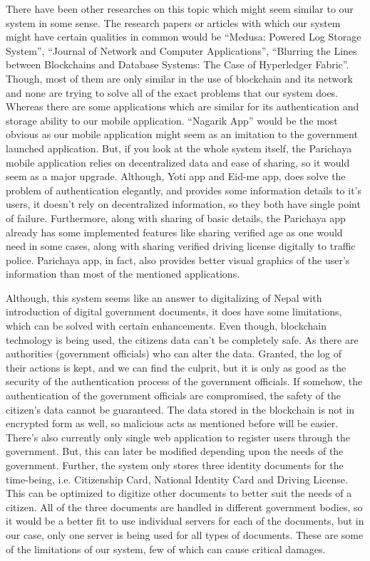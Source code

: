 There have been other researches on this topic which might seem similar to our system in some sense. The research papers or articles with which our system might have certain qualities in common would be “Medusa: Powered Log Storage System”,  “Journal of Network and Computer Applications”, “Blurring the Lines between Blockchains and Database Systems: The Case of Hyperledger Fabric”. Though, most of them are only similar in the use of blockchain and its network and none are trying to solve all of the exact problems that our system does. Whereas there are some applications which are similar for its authentication and storage ability to our mobile application. “Nagarik App” would be the most obvious as our mobile application might seem as an imitation to the government launched application. But, if you look at the whole system itself, the Parichaya mobile application relies on decentralized data and ease of sharing, so it would seem as a major upgrade. Although, Yoti app and Eid-me app, does solve the problem of authentication elegantly, and provides some information details to it’s users, it doesn’t rely on decentralized information, so they both have single point of failure. Furthermore, along with sharing of basic details, the Parichaya app already has some implemented features like sharing verified age as one would need in some cases, along with sharing verified driving license digitally to traffic police. Parichaya app, in fact, also provides better visual graphics of the user’s information than most of the mentioned applications.

Although, this system seems like an answer to digitalizing of Nepal with introduction of digital government documents, it does have some limitations, which can be solved with certain enhancements. Even though, blockchain technology is being used, the citizens data can’t be completely safe. As there are authorities (government officials) who can alter the data. Granted, the log of their actions is kept, and we can find the culprit, but it is only as good as the security of the authentication process of the government officials. If somehow, the authentication of the government officials are compromised, the safety of the citizen’s data cannot be guaranteed. The data stored in the blockchain is not in encrypted form as well, so malicious acts as mentioned before will be easier. There’s also currently only single web application to register users through the government.  But, this can later be modified depending upon the needs of the government. Further, the system only stores three identity documents for the time-being, i.e. Citizenship Card, National Identity Card and Driving License. This can be optimized to digitize other documents to better suit the needs of a citizen. All of the three documents are handled in different government bodies, so it would be a better fit to use individual servers for each of the documents, but in our case, only one server is being used for all types of documents. These are some of the limitations of our system, few of which can cause critical damages.

